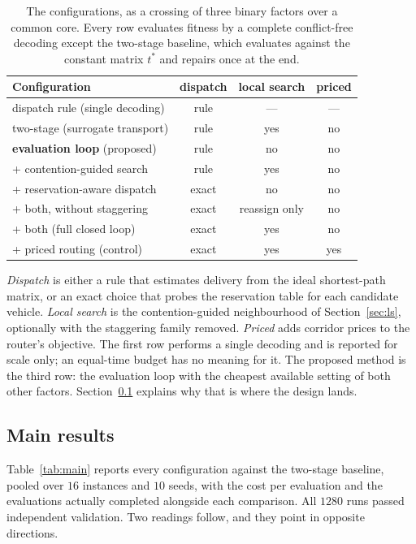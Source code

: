 \documentclass[manuscript,screen,review]{acmart}
\begin{document}
\begin{table}[t]
\caption{The configurations, as a crossing of three binary factors over a
common core. Every row evaluates fitness by a complete conflict-free decoding
except the two-stage baseline, which evaluates against the constant matrix
$t^{*}$ and repairs once at the end.}
\label{tab:arms}
\footnotesize
\begin{tabular}{@{}lccc@{}}
\toprule
Configuration & dispatch & local search & priced \\
\midrule
dispatch rule (single decoding) & rule & --- & --- \\
two-stage (surrogate transport) & rule & yes & no \\
\midrule
\textbf{evaluation loop} (proposed) & rule & no & no \\
\quad + contention-guided search & rule & yes & no \\
\quad + reservation-aware dispatch & exact & no & no \\
\quad + both, without staggering & exact & reassign only & no \\
\quad + both (full closed loop) & exact & yes & no \\
\midrule
\quad + priced routing (control) & exact & yes & yes \\
\bottomrule
\end{tabular}
\end{table}

\emph{Dispatch} is either a rule that estimates delivery from the ideal
shortest-path matrix, or an exact choice that probes the reservation table for
each candidate vehicle. \emph{Local search} is the contention-guided
neighbourhood of Section~\ref{sec:ls}, optionally with the staggering family
removed. \emph{Priced} adds corridor prices to the router's objective. The
first row performs a single decoding and is reported for scale only; an
equal-time budget has no meaning for it. The proposed method is the third row:
the evaluation loop with the cheapest available setting of both other factors.
Section~\ref{sec:main} explains why that is where the design lands.

\subsection{Main results}
\label{sec:main}

Table~\ref{tab:main} reports every configuration against the two-stage
baseline, pooled over $16$ instances and $10$ seeds, with the cost per
evaluation and the evaluations actually completed alongside each comparison.
All $1280$ runs passed independent validation. Two readings follow, and they
point in opposite directions.
\end{document}
